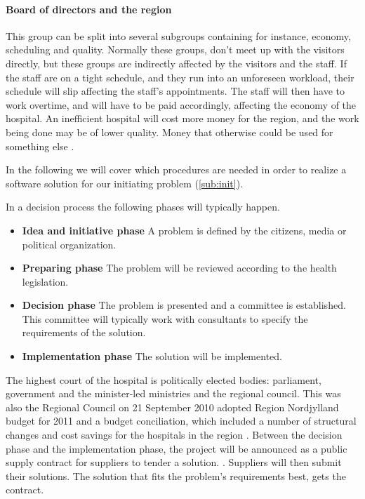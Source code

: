 \paragraph{Board of directors and the region}
This group can be split into several subgroups containing for instance, economy, scheduling and quality. Normally these groups, don't meet up with the visitors directly, but these groups are indirectly affected by the visitors and the staff. If the staff are on a tight schedule, and they run into an unforeseen workload, their schedule will slip affecting the staff's appointments. The staff will then have to work overtime, and  will have to be paid accordingly, affecting the economy of the hospital. An inefficient hospital will cost more money for the region, and the work being done may be of lower quality. Money that otherwise could be used for something else \cite{timer_til_at_hjelpe_rundt}.

In the following we will cover which procedures are needed in order to realize a software solution for our initiating problem (\cref{sub:init}).

In a decision process the following phases will typically happen. \cite{Sjaelland}


\begin{itemize}
  \setlength{\itemsep}{1pt}
  \setlength{\parskip}{0pt}
  \setlength{\parsep}{0pt}
	\item \textbf{Idea and initiative phase} A problem is defined by the citizens, media or political organization.
	\item \textbf{Preparing phase} The problem will be reviewed according to the health legislation.
	\item \textbf{Decision phase} The problem is presented and a committee is established. This committee will typically work with consultants to specify the requirements of the solution.
	\item \textbf{Implementation phase} The solution will be implemented. 
\end{itemize}

The highest court of the hospital is politically elected bodies: parliament, government and the minister-led ministries and the regional council. This was also the Regional Council on 21 September 2010 adopted Region Nordjylland budget for 2011 and a budget conciliation, which included a number of structural changes and cost savings for the hospitals in the region \cite{politisk_styret_ca}. Between the decision phase and the implementation phase, the project will be announced as a public supply contract for suppliers to tender a solution. \cite{Union2004}. Suppliers will then submit their solutions. The solution that fits the problem's requirements best, gets the contract. 